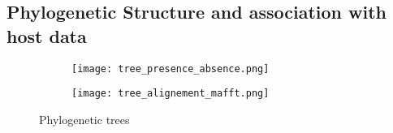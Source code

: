 \subsection*{Phylogenetic Structure and association with host data}
\graphicspath{{images/phylogeneticStructureHostData/}}



\begin{figure}[h]	%
    \centering
    \begin{subfigure}[b]{0.8\textwidth}
        \centering
        \texttt{[image: tree\_presence\_absence.png]}
        \caption{\scriptsize{}}
        \label{fig:tree_genes}
    \end{subfigure}
    \begin{subfigure}[b]{0.8\textwidth}
        \centering
        \texttt{[image: tree\_alignement\_mafft.png]}
        \caption{}
        \label{fig:tree_align}
    \end{subfigure}
       \caption{Phylogenetic trees}
       \label{fig:trees}
\end{figure}

